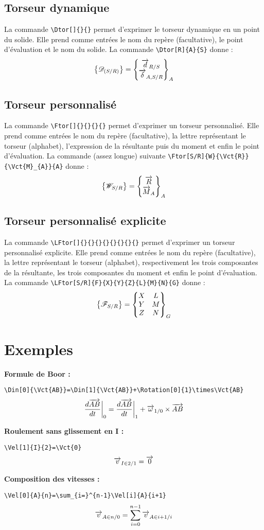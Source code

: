 \documentclass[12pt]{article}
\begin{document}
\subsection{Torseur dynamique}
La commande \verb|\Dtor[]{}{}| permet d'exprimer le torseur dynamique en un point du solide. Elle prend comme entrées le nom du repère (facultative), le point d'évaluation et le nom du solide. La commande \verb|\Dtor[R]{A}{S}| donne : $$\Dtor[R]{A}{S}$$

\subsection{Torseur personnalisé}
La commande \verb|\Ftor[]{}{}{}{}| permet d'exprimer un torseur personnalisé. Elle prend comme entrées le nom du repère (facultative), la lettre représentant le torseur (alphabet), l'expression de la résultante puis du moment et enfin le point d'évaluation. La commande (assez longue) suivante \verb|\Ftor[S/R]{W}{\Vct{R}}{\Vct{M}_{A}}{A}| donne : $$\Ftor[S/R]{W}{\Vct{R}}{\Vct{M}_{A}}{A}$$

\subsection{Torseur personnalisé explicite}
La commande \verb|\LFtor[]{}{}{}{}{}{}{}{}| permet d'exprimer un torseur personnalisé explicite. Elle prend comme entrées le nom du repère (facultative), la lettre représentant le torseur (alphabet), respectivement les trois composantes de la résultante, les trois composantes du moment et enfin le point d'évaluation.
La commande \verb|\LFtor[S/R]{F}{X}{Y}{Z}{L}{M}{N}{G}| donne : $$\LFtor[S/R]{F}{X}{Y}{Z}{L}{M}{N}{G}$$

\newpage

\section{Exemples}
\textbf{Formule de Boor :}

\verb|\Din[0]{\Vct{AB}}=\Din[1]{\Vct{AB}}+\Rotation[0]{1}\times\Vct{AB}|
$$\Din[0]{\Vct{AB}}=\Din[1]{\Vct{AB}}+\Rotation[0]{1}\times\Vct{AB}$$

\textbf{Roulement sans glissement en I :}

\verb|\Vel[1]{I}{2}=\Vct{0}|
$$\Vel[1]{I}{2}=\Vct{0}$$

\textbf{Composition des vitesses :}

\verb|\Vel[0]{A}{n}=\sum_{i=}^{n-1}\Vel[i]{A}{i+1}|
$$\Vel[0]{A}{n}=\sum_{i=0}^{n-1}\Vel[i]{A}{i+1}$$
 
\end{document}
